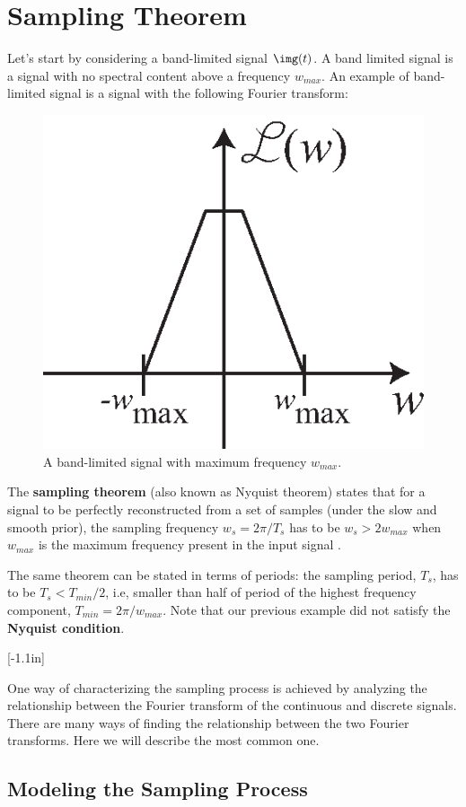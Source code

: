 \section{Sampling Theorem}

Let's start by considering a band-limited signal $\img(t)$.
A band limited signal is a signal with no spectral content above a frequency $w_{max}$. An example of band-limited signal is a signal with the following Fourier transform:
\begin{figure}
    \centerline{
        \includegraphics[width=0.3\linewidth]{figures/Image_processing_sampling/band_limited_signal.eps}
    }
    \caption{A band-limited signal with maximum frequency $w_{max}$.}
    \label{fig:band_limited_signal}
\end{figure}

The {\bf sampling theorem} (also known as Nyquist theorem)
states that for a signal to be perfectly reconstructed from a set of samples (under the slow and smooth prior), the sampling frequency $w_s = 2 \pi /T_s$ has to be $w_s > 2w_{max}$ when $w_{max}$ is the maximum frequency present in the input signal \cite{Shannon1948}.


The same theorem can be stated in terms of periods: the sampling period, $T_s$, has to be $T_s < T_{min} / 2$, i.e, smaller than half of period of the highest frequency component, $T_{min} = 2 \pi /w_{max}$. Note that our previous example did not satisfy the {\bf Nyquist condition}.

[-1.1in]

One way of characterizing the sampling process is achieved by analyzing the relationship between the Fourier transform of the continuous and discrete signals.
There are many ways of finding the relationship between the two Fourier transforms. Here we will describe the most common one.

\subsection{Modeling the Sampling Process}

